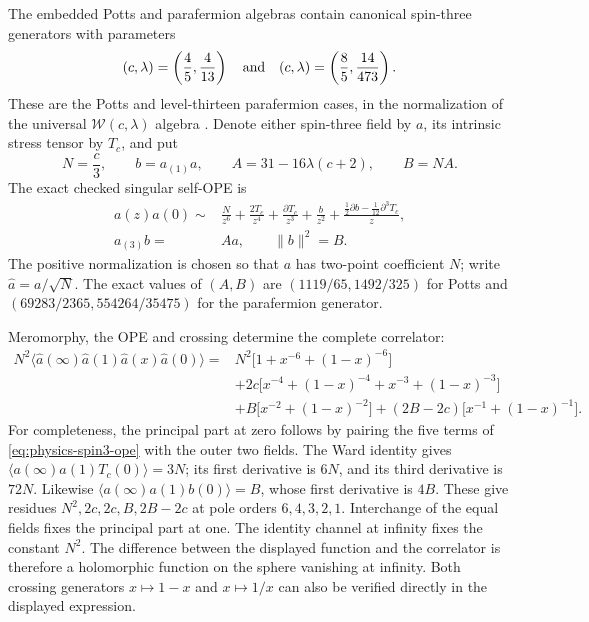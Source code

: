 The embedded Potts and parafermion algebras contain canonical spin-three generators with
parameters
\begin{equation}
 (c,\lambda)=\left(\frac45,\frac4{13}\right)
 \quad\hbox{and}\quad
 (c,\lambda)=\left(\frac85,\frac{14}{473}\right).
\end{equation}
These are the Potts and level-thirteen parafermion cases, in the
normalization of the universal $\mathcal W(c,\lambda)$ algebra
\cite{Linshaw,DLY}.  Denote either spin-three field by $a$, its intrinsic
stress tensor by $T_c$, and put
\begin{equation}
 N=\frac c3,\qquad b=a_{(1)}a,\qquad
 A=31-16\lambda(c+2),\qquad B=NA.
\end{equation}
The exact checked singular self-OPE is
\begin{align}
 a(z)a(0)\sim{}&\frac{N}{z^6}+\frac{2T_c}{z^4}
 +\frac{\partial T_c}{z^3}+\frac{b}{z^2}
 +\frac{\frac12\partial b-\frac1{12}\partial^3T_c}{z},
 \label{eq:physics-spin3-ope}\\
 a_{(3)}b={}&Aa,\qquad \|b\|^2=B.
\end{align}
The positive normalization is chosen so that $a$ has two-point
coefficient $N$; write $\widehat a=a/\sqrt N$.  The exact values of
$(A,B)$ are $(1119/65,1492/325)$ for Potts and
$(69283/2365,554264/35475)$ for the parafermion generator.

Meromorphy, the OPE and crossing determine the complete correlator:
\begin{align}
 N^2\langle\widehat a(\infty)\widehat a(1)
                 \widehat a(x)\widehat a(0)\rangle
 ={}&N^2\bigl[1+x^{-6}+(1-x)^{-6}\bigr]\nonumber\\
 &+2c\bigl[x^{-4}+(1-x)^{-4}
             +x^{-3}+(1-x)^{-3}\bigr]\nonumber\\
 &+B\bigl[x^{-2}+(1-x)^{-2}\bigr]
 +(2B-2c)\bigl[x^{-1}+(1-x)^{-1}\bigr].
 \label{eq:physics-spin3-fourpoint}
\end{align}
For completeness, the principal part at zero follows by pairing the
five terms of \eqref{eq:physics-spin3-ope} with the outer two fields.
The Ward identity gives
$\langle a(\infty)a(1)T_c(0)\rangle=3N$; its first derivative is
$6N$, and its third derivative is $72N$.  Likewise
$\langle a(\infty)a(1)b(0)\rangle=B$, whose first derivative is
$4B$.  These give residues $N^2,2c,2c,B,2B-2c$ at pole orders
$6,4,3,2,1$.  Interchange of the equal fields fixes the principal part
at one.  The identity channel at infinity fixes the constant $N^2$.
The difference between the displayed function and the correlator is
therefore a holomorphic function on the sphere vanishing at infinity.
Both crossing generators $x\mapsto1-x$ and $x\mapsto1/x$ can also be
verified directly in the displayed expression.

